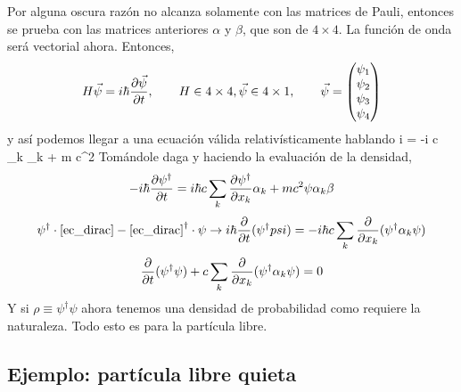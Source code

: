 \documentclass[10pt,oneside]{CBFT_book}
\begin{document}
Por alguna oscura razón no alcanza solamente con las matrices de Pauli, entonces se prueba con las
matrices anteriores $\alpha$ y $\beta$, que son de $4\times 4$. La función de onda será vectorial
ahora.
Entonces,
\[
	H \vec{\psi} = i \hbar \frac{\partial^{\hspace{-0.05em}} {\vec{\psi}}}{\partial {t}^{\hspace{-0.05em}}}, 
	\qquad H \in 4\times 4, \vec{\psi} \in 4\times 1, \qquad
	\vec{\psi} = \begin{pmatrix} 
			\psi_1 \\
			\psi_2 \\
			\psi_3 \\
			\psi_4
		\end{pmatrix}
\]
y así podemos llegar a una ecuación válida relativísticamente hablando
\be \label{ec_dirac}
	i \hbar {} = -i \hbar c \sum_k \alpha_k  + m c^2 \beta \psi
\ee
Tomándole daga y haciendo la evaluación de la densidad,
\[
	-i \hbar \frac{\partial^{\hspace{-0.05em}} {\psi^\dagger}}{\partial {t}^{\hspace{-0.05em}}} = i \hbar c \sum_k \frac{\partial^{\hspace{-0.05em}} {\psi^\dagger}}{\partial {x_k}^{\hspace{-0.05em}}}\alpha_k + 
	m c^2\psi\alpha_k\beta
\]
\[
	\psi^\dagger\cdot\eqref{ec_dirac} - \eqref{ec_dirac}^\dagger\cdot \psi \rightarrow 
	i\hbar \frac{\partial^{\hspace{-0.05em}} {}}{\partial {t}^{\hspace{-0.05em}}}(\psi^\dagger psi) = -i\hbar c \sum_k \frac{\partial^{\hspace{-0.05em}} {}}{\partial {x_k}^{\hspace{-0.05em}}}(\psi^\dagger \alpha_k \psi)
\]
\[
	\frac{\partial^{\hspace{-0.05em}} {}}{\partial {t}^{\hspace{-0.05em}}}(\psi^\dagger \psi) + c \sum_k \frac{\partial^{\hspace{-0.05em}} {}}{\partial {x_k}^{\hspace{-0.05em}}}(\psi^\dagger \alpha_k \psi) = 0
\]
Y si $\rho \equiv \psi^\dagger\psi$ ahora tenemos una densidad de probabilidad como requiere la naturaleza.
Todo esto es para la partícula libre.

\subsection{Ejemplo: partícula libre quieta}
\end{document}
